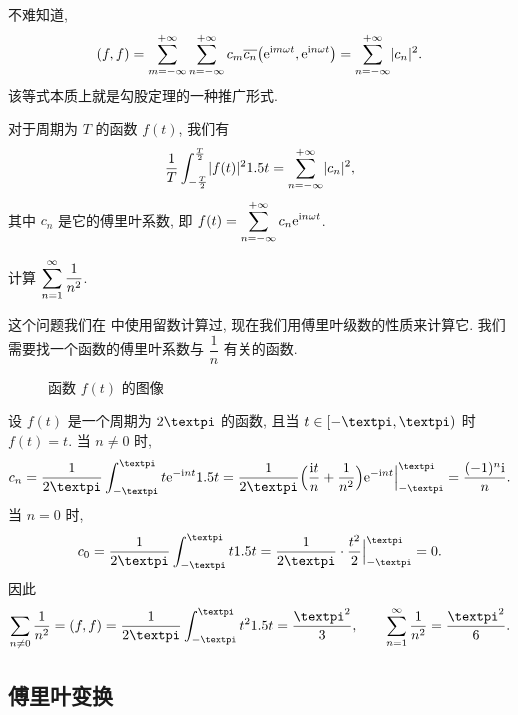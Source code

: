 不难知道,
\[
  (f,f)
  =\sum_{m=-\infty}^{+\infty}\displaystyle\sum_{n=-\infty}^{+\infty} 
    c_m\overline{c_n}\bigl(\mathrm{e}^{\mathrm{i} m\omega t},\mathrm{e}^{\mathrm{i} n\omega t}\bigr)
  =\displaystyle\sum_{n=-\infty}^{+\infty} \lvert c_n\rvert^2.
\]
该等式本质上就是勾股定理的一种推广形式.

\begin{theorem}[帕塞瓦尔恒等式]
  对于周期为 $T$ 的函数 $f(t)$, 我们有
  \[
     \frac1{T}\displaystyle\int_{-\frac T2}^{\frac T2} \lvert f(t)\rvert^21.5 t
    =\displaystyle\sum_{n=-\infty}^{+\infty} \lvert c_n\rvert^2,
  \]
  其中 $c_n$ 是它的傅里叶系数, 即 $f(t)=\displaystyle\sum_{n=-\infty}^{+\infty} c_n\mathrm{e}^{\mathrm{i} n\omega t}$.
\end{theorem}

\begin{example}
  计算 $\displaystyle\sum_{n=1}^{\infty} \dfrac1{n^2}$.
\end{example}

这个问题我们在 中使用留数计算过, 现在我们用傅里叶级数的性质来计算它.
我们需要找一个函数的傅里叶系数与 $\dfrac1{n}$ 有关的函数.

\begin{figure}[H]
  \centering
  \caption{函数 $f(t)$ 的图像}
\end{figure}

\begin{solution}
  设 $f(t)$ 是一个周期为 $2\cpi$ 的函数, 且当 $t\in[-\cpi,\cpi)$ 时 $f(t)=t$.
  当 $n\neq0$ 时,
  \[
    c_n=\frac1{2\cpi}\int_{-\cpi}^\cpi t\ee^{-\ii nt}\d t
    =\frac1{2\cpi}\Bigl(\frac{\ii t}n+\frac1{n^2}\Bigr)\ee^{-\ii nt}\Big|_{-\cpi}^\cpi
    =\frac{(-1)^n\ii}n.
  \]
  当 $n=0$ 时,
  \[
    c_0=\frac1{2\cpi}\int_{-\cpi}^\cpi t\d t
    =\frac1{2\cpi}\cdot\frac{t^2}2\Big|_{-\cpi}^\cpi
    =0.
  \]
  因此
  \[
     \sum_{n\neq 0}\frac1{n^2}
    =(f,f)
    =\frac1{2\cpi}\int_{-\cpi}^{\cpi}t^2\d t
    =\frac{\cpi^2}3,
    \qquad
    \sumf1 \frac1{n^2}=\frac{\cpi^2}6.
  \]
\end{solution}


\subsection{傅里叶变换}

